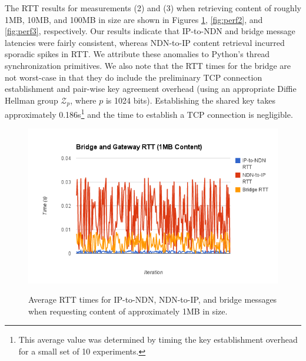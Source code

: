 The RTT results for measurements (2) and (3) when retrieving content of roughly 1MB, 10MB, and 100MB in size are shown in Figures \ref{fig:perf1}, \ref{fig:perf2}, and \ref{fig:perf3}, respectively. Our results indicate that IP-to-NDN and bridge message latencies were fairly consistent, whereas NDN-to-IP content retrieval incurred sporadic spikes in RTT. We attribute these anomalies to Python's thread synchronization primitives. We also note that the RTT times for the bridge are not worst-case in that they do include the preliminary TCP connection establishment and pair-wise key agreement overhead (using an appropriate Diffie Hellman group $\mathcal{Z}_p$, where $p$ is 1024 bits). Establishing the shared key takes approximately 0.186s\footnote{This average value was determined by timing the key establishment overhead for a small set of 10 experiments.} and the time to establish a TCP connection is negligible.

\begin{figure}
\begin{center}
\includegraphics[scale=0.7]{./images/small.png}
\label{fig:perf1}
\caption{Average RTT times for IP-to-NDN, NDN-to-IP, and bridge messages when requesting content of approximately 1MB in size.}
\end{center}
\end{figure}

